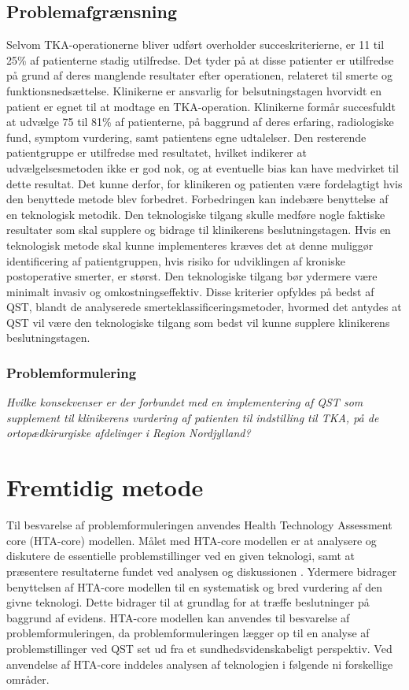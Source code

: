 \section{Problemafgrænsning}
Selvom TKA-operationerne bliver udført overholder succeskriterierne, er 11 til 25\% af patienterne stadig utilfredse. Det tyder på at disse patienter er utilfredse på grund af deres manglende resultater efter operationen, relateret til smerte og funktionsnedsættelse. Klinikerne er ansvarlig for belsutningstagen hvorvidt en patient er egnet til at modtage en TKA-operation. Klinikerne formår succesfuldt at udvælge 75 til 81\% af patienterne, på baggrund af deres erfaring, radiologiske fund, symptom vurdering, samt patientens egne udtalelser. Den resterende patientgruppe er utilfredse med resultatet, hvilket indikerer at udvælgelsesmetoden ikke er god nok, og at eventuelle bias kan have medvirket til dette resultat. Det kunne derfor, for klinikeren og patienten være fordelagtigt hvis den benyttede metode blev forbedret. Forbedringen kan indebære benyttelse af en teknologisk metodik. Den teknologiske tilgang skulle medføre nogle faktiske resultater som skal supplere og bidrage til klinikerens beslutningstagen. Hvis en teknologisk metode skal kunne implementeres kræves det at denne muliggør identificering af patientgruppen, hvis risiko for udviklingen af kroniske postoperative smerter, er størst. Den teknologiske tilgang bør ydermere være minimalt invasiv og omkostningseffektiv. Disse kriterier opfyldes på bedst af QST, blandt de analyserede smerteklassificeringsmetoder, hvormed det antydes at QST vil være den teknologiske tilgang som bedst vil kunne supplere klinikerens beslutningstagen. 
\subsection*{Problemformulering}
\begin{center}
	\textit{Hvilke konsekvenser er der forbundet med en implementering af QST som supplement til klinikerens vurdering af patienten til indstilling til TKA, på de ortopædkirurgiske afdelinger i Region Nordjylland?}
\end{center}

\chapter{Fremtidig metode}\vspace{-.75cm}
Til besvarelse af problemformuleringen anvendes Health Technology Assessment core (HTA-core) modellen. Målet med HTA-core modellen er at analysere og diskutere de essentielle problemstillinger ved en given teknologi, samt at præsentere resultaterne fundet ved analysen og diskussionen \citep{HTAcore}. Ydermere bidrager benyttelsen af HTA-core modellen til en systematisk og bred vurdering af den givne teknologi. Dette bidrager til at grundlag for at træffe beslutninger på baggrund af evidens. \citep{mtvhaandbog2007} \citep{HTAcore}  HTA-core modellen kan anvendes til besvarelse af problemformuleringen, da problemformuleringen lægger op til en analyse af problemstillinger ved QST set ud fra et sundhedsvidenskabeligt perspektiv. Ved anvendelse af HTA-core inddeles analysen af teknologien i følgende ni forskellige områder. \citep{HTAcore}

